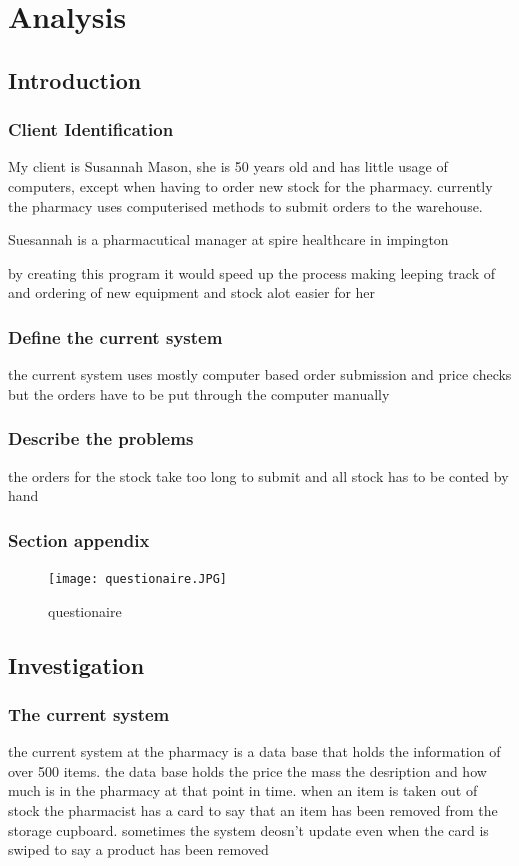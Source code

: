 \chapter{Analysis}

\section{Introduction}

\subsection{Client Identification}
My client is Susannah Mason, she is 50 years old and has little usage of computers, except when having to order new stock for the pharmacy. currently the pharmacy uses computerised methods to submit orders to the warehouse.

Suesannah is a pharmacutical manager at spire healthcare in impington 

by  creating this program it would speed up the process making leeping track of and ordering of new equipment and stock alot easier for her 
\subsection{Define the current system}
 the current system uses mostly computer based order submission and price checks but the orders have to be put through the computer manually 
\subsection{Describe the problems}
the orders for the stock take too long to submit and all stock has to be conted by hand 
\pagebreak{}
\subsection{Section appendix}

\begin{figure}[ht!]
\centering
\texttt{[image: questionaire.JPG]}
\caption{questionaire \label{overflow}}
\end{figure}
\pagebreak{}
\section{Investigation}
\subsection{The current system}
the current system at the pharmacy is a data base that holds the information of over 500 items. the data base holds the price the mass the desription and how much is in the pharmacy at that point in time. when an item is taken out of stock the pharmacist has a card to say that an item has been removed from the storage cupboard. sometimes the system deosn't update even when the card is swiped to say a product has been removed
